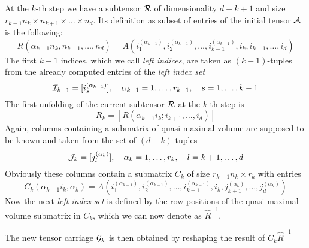 At the $k$-th step we have a subtensor $\mathcal{R}$ of dimensionality $d-k+1$ and size $r_{k-1}n_k \times n_{k+1} \times \ldots \times n_d$. Its definition as subset of entries of the initial tensor $\mathcal{A}$ is the following:
\begin{equation*}
  R(\alpha_{k-1}n_k,n_{k+1},\ldots,n_d) = A(i_1^{(\alpha_{k-1})},i_2^{(\alpha_{k-1})},\ldots,i_{k-1}^{(\alpha_{k-1})},i_k,i_{k+1},\ldots,i_d)
\end{equation*}
The first $k-1$ indices, which we call \emph{left indices}, are taken as $(k-1)$-tuples from the already computed entries of the \emph{left index set} 
\begin{equation*}
  \mathcal{I}_{k-1} = [i_s^{(\alpha_{k-1})}],\quad \alpha_{k-1} = 1,\ldots,r_{k-1},\quad s = 1,\ldots,k-1
\end{equation*}
The first unfolding of the current subtensor $\mathcal{R}$ at the $k$-th step is
\begin{equation*}
  R_k = [R(\alpha_{k-1}i_k;i_{k+1},\ldots,i_d)]
\end{equation*}
Again, columns containing a submatrix of quasi-maximal volume are supposed to be known and taken from the set of $(d-k)$-tuples
\begin{equation*}
  \mathcal{J}_k = [j_l^{(\alpha_k)}],\quad \alpha_k = 1,\ldots,r_k,\quad l = k+1,\ldots,d
\end{equation*}
Obviously these columns contain a submatrix $C_k$ of size $r_{k-1}n_k \times r_k$ with entries
\begin{equation*}
  C_k(\alpha_{k-1}i_k,\alpha_k) = A(i_1^{(\alpha_{k-1})},i_2^{(\alpha_{k-1})},\ldots,i_{k-1}^{(\alpha_{k-1})},i_k,j_{k+1}^{(\alpha_k)},\ldots,j_d^{(\alpha_k)})
\end{equation*}
Now the next \emph{left index set} is defined by the row positions of the quasi-maximal volume submatrix in $C_k$, which we can now denote as $\hat{R}^{-1}$.

The new tensor carriage $\mathcal{G}_k$ is then obtained by reshaping the result of $C_k \hat{R}^{-1}$

